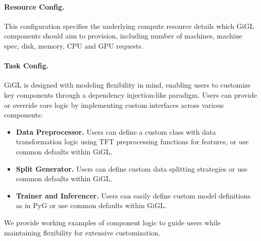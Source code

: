 \paragraph{Resource Config.} This configuration specifies the underlying compute resource details which GiGL components should aim to provision, including number of machines, machine spec, disk, memory, CPU and GPU requests.

\paragraph{Task Config.} GiGL is designed with modeling flexibility in mind, enabling users to customize key components through a dependency injection-like paradigm.  Users can provide or override core logic by implementing custom interfaces across various components:

\begin{itemize}[leftmargin=*]
    \item \textbf{Data Preprocessor.} Users can define a custom class with data transformation logic using TFT preprocessing functions for features, or use common defaults within GiGL.
    \item \textbf{Split Generator.} Users can define custom data splitting strategies or use common defaults within GiGL.
    \item \textbf{Trainer and Inferencer.} Users can easily define custom model definitions as in PyG or use common defaults within GiGL.
\end{itemize}

We provide working examples of component logic to guide users while maintaining flexibility for extensive customization.  

